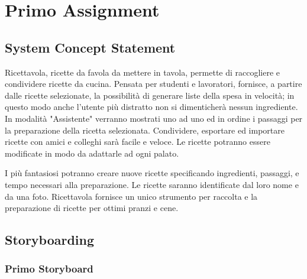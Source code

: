 

\section{Primo Assignment}



\subsection{System Concept Statement}

Ricettavola, ricette da favola da mettere in tavola, permette di raccogliere e condividere ricette da cucina.
Pensata per studenti e lavoratori, fornisce, a partire dalle ricette selezionate, la possibilità di generare liste della spesa in velocità;
in questo modo anche l'utente più distratto non si dimenticherà nessun ingrediente.
In modalità "Assistente" verranno mostrati uno ad uno ed in ordine i passaggi per la preparazione della ricetta selezionata.
Condividere, esportare ed importare ricette con amici e colleghi sarà facile e veloce.
Le ricette potranno essere modificate in modo da adattarle ad ogni palato.

I più fantasiosi potranno creare nuove ricette specificando ingredienti, passaggi, e tempo necessari alla preparazione.
Le ricette saranno identificate dal loro nome e da una foto.
Ricettavola fornisce un unico strumento per raccolta e la preparazione di ricette per ottimi pranzi e cene.







\subsection{Storyboarding}
\subsubsection{Primo Storyboard}

